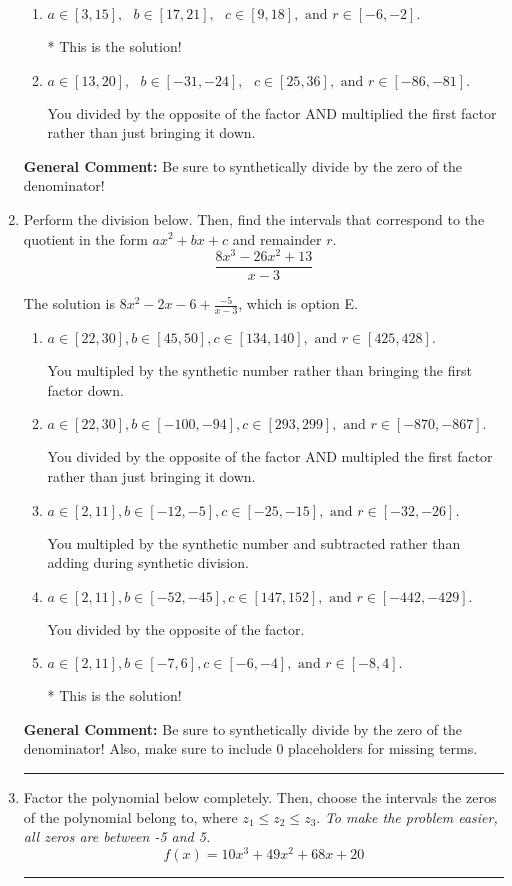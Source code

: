 \documentclass{extbook}[14pt]
\newcommand{\litem}[1]{\item #1

\rule{\textwidth}{0.4pt}}
\begin{document}
\begin{enumerate}
{\begin{enumerate}[label=\Alph*.]
 You multiplied by the synthetic number rather than bringing the first factor down.
\item \( a \in [3, 15], \text{   } b \in [17, 21], \text{   } c \in [9, 18], \text{   and   } r \in [-6, -2]. \)

* This is the solution!
\item \( a \in [13, 20], \text{   } b \in [-31, -24], \text{   } c \in [25, 36], \text{   and   } r \in [-86, -81]. \)

 You divided by the opposite of the factor AND multiplied the first factor rather than just bringing it down.
\end{enumerate}

\textbf{General Comment:} Be sure to synthetically divide by the zero of the denominator!
}
\litem{
Perform the division below. Then, find the intervals that correspond to the quotient in the form $ax^2+bx+c$ and remainder $r$.
\[ \frac{8x^{3} -26 x^{2} + 13}{x -3} \]

The solution is \( 8x^{2} -2 x -6 + \frac{-5}{x -3} \), which is option E.\begin{enumerate}[label=\Alph*.]
\item \( a \in [22, 30], b \in [45, 50], c \in [134, 140], \text{ and } r \in [425, 428]. \)

 You multipled by the synthetic number rather than bringing the first factor down.
\item \( a \in [22, 30], b \in [-100, -94], c \in [293, 299], \text{ and } r \in [-870, -867]. \)

 You divided by the opposite of the factor AND multipled the first factor rather than just bringing it down.
\item \( a \in [2, 11], b \in [-12, -5], c \in [-25, -15], \text{ and } r \in [-32, -26]. \)

 You multipled by the synthetic number and subtracted rather than adding during synthetic division.
\item \( a \in [2, 11], b \in [-52, -45], c \in [147, 152], \text{ and } r \in [-442, -429]. \)

 You divided by the opposite of the factor.
\item \( a \in [2, 11], b \in [-7, 6], c \in [-6, -4], \text{ and } r \in [-8, 4]. \)

* This is the solution!
\end{enumerate}

\textbf{General Comment:} Be sure to synthetically divide by the zero of the denominator! Also, make sure to include 0 placeholders for missing terms.
}
\litem{
Factor the polynomial below completely. Then, choose the intervals the zeros of the polynomial belong to, where $z_1 \leq z_2 \leq z_3$. \textit{To make the problem easier, all zeros are between -5 and 5.}
\[ f(x) = 10x^{3} +49 x^{2} +68 x + 20 \]

}
\end{enumerate}
\end{document}
